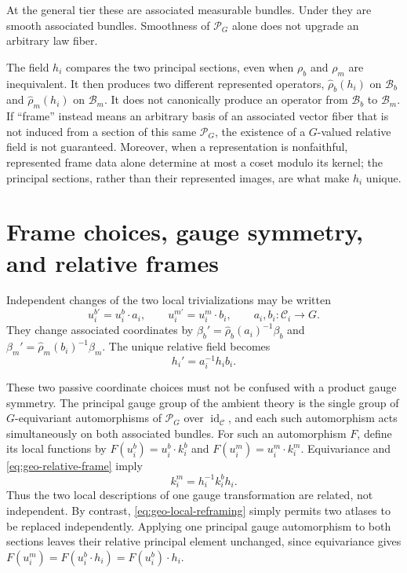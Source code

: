 At the general tier these are associated measurable bundles.  Under
 they are smooth associated bundles.  Smoothness of $\mathscr P_G$ alone does not
upgrade an arbitrary law fiber.

The field $h_i$ compares the two principal sections, even when $\rho_b$ and $\rho_m$ are
inequivalent.  It then produces two different represented operators,
$\widehat\rho_b(h_i)$ on $\mathcal B_b$ and $\widehat\rho_m(h_i)$ on $\mathcal B_m$.  It does not
canonically produce an operator from $\mathcal B_b$ to $\mathcal B_m$.  If ``frame'' instead means
an arbitrary basis of an associated vector fiber that is not induced from a section of this same
$\mathscr P_G$, the existence of a $G$-valued relative field is not guaranteed.  Moreover, when a
representation is nonfaithful, represented frame data alone determine at most a coset modulo its
kernel; the principal sections, rather than their represented images, are what make $h_i$ unique.

\section{Frame choices, gauge symmetry, and relative frames}
\label{sec:geo-frame-gauge}

Independent changes of the two local trivializations may be written
\begin{equation}
u_i^{b\prime}=u_i^b\cdot a_i,
\qquad
u_i^{m\prime}=u_i^m\cdot b_i,
\qquad a_i,b_i:\mathcal C_i\to G.
\label{eq:geo-local-reframing}
\end{equation}
They change associated coordinates by
$\beta_b'=\widehat\rho_b(a_i)^{-1}\beta_b$ and
$\beta_m'=\widehat\rho_m(b_i)^{-1}\beta_m$.  The unique relative field becomes
\begin{equation}
h_i'=a_i^{-1}h_i b_i.
\label{eq:geo-relative-frame-law}
\end{equation}

These two passive coordinate choices must not be confused with a product gauge symmetry.  The
principal gauge group of the ambient theory is the single group of $G$-equivariant automorphisms
of $\mathscr P_G$ over $\operatorname{id}_{\mathcal C}$, and each such automorphism acts simultaneously on
both associated bundles.  For such an automorphism $F$, define its local functions by
$F(u_i^b)=u_i^b\cdot k_i^b$ and $F(u_i^m)=u_i^m\cdot k_i^m$.  Equivariance and
\eqref{eq:geo-relative-frame} imply
\begin{equation}
k_i^m=h_i^{-1}k_i^b h_i.
\label{eq:geo-diagonal-gauge-functions}
\end{equation}
Thus the two local descriptions of one gauge transformation are related, not independent.  By
contrast, \eqref{eq:geo-local-reframing} simply permits two atlases to be replaced independently.
Applying one principal gauge automorphism to both sections leaves their relative principal element
unchanged, since equivariance gives $F(u_i^m)=F(u_i^b\cdot h_i)=F(u_i^b)\cdot h_i$.


